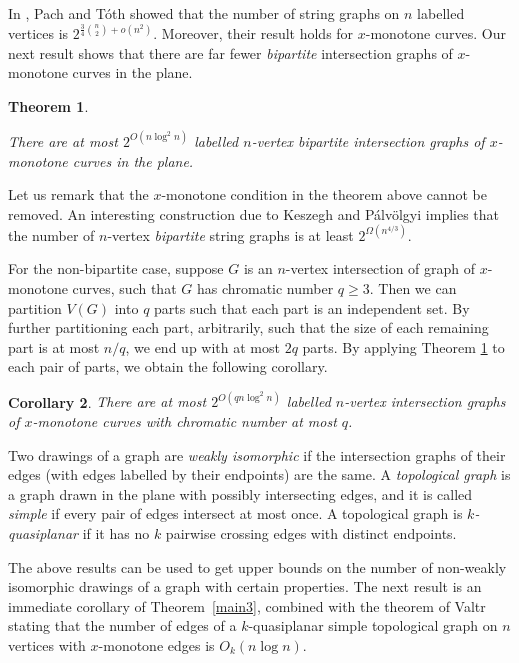 \documentclass[11pt]{article}
\theoremstyle{plain}
\newtheorem{theorem}{Theorem}[section]
\newtheorem{corollary}[theorem]{Corollary}
\theoremstyle{definition}
\theoremstyle{remark}
\begin{document}
In \cite{PT06}, Pach and T\'oth showed that the number of string graphs on $n$ labelled vertices is $2^{\frac{3}{4}\binom{n}{2}+o(n^2)}$.  Moreover, their result holds for $x$-monotone curves.  Our next result shows that there are far fewer \emph{bipartite} intersection graphs of $x$-monotone curves in the plane.






    
\begin{theorem}\label{main}

There are at most $2^{O(n\log^2 n)}$ labelled $n$-vertex bipartite intersection graphs of $x$-monotone curves in the plane.


\end{theorem}



\noindent Let us remark that the $x$-monotone condition in the theorem above cannot be removed.  An interesting construction due to Keszegh and P\'alv\"olgyi \cite{KP} implies that the number of $n$-vertex \emph{bipartite} string graphs is at least $2^{\Omega(n^{4/3})}$.   


For the non-bipartite case, suppose $G$ is an $n$-vertex intersection of graph of $x$-monotone curves, such that $G$ has chromatic number $q\geq 3$.  Then we can partition $V(G)$ into $q$ parts such that each part is an independent set. By further partitioning each part, arbitrarily, such that the size of each remaining part is at most $n/q$, we end up with at most $2q$ parts.  By applying Theorem \ref{main} to each pair of parts, we obtain the following corollary.


\begin{corollary}\label{main2}
There are at most $2^{O(qn\log^2 n)}$ labelled $n$-vertex intersection graphs of $x$-monotone curves with chromatic number at most $q$.

\end{corollary}

Two drawings of a graph are \emph{weakly isomorphic} if the intersection graphs of their edges (with edges labelled by their endpoints) are the same. 
A {\it topological graph} is a graph drawn in the plane with possibly intersecting edges, and it is called \emph{simple} if every pair of edges 
intersect at most once. A topological graph is \emph{$k$-quasiplanar} if it has no $k$ pairwise crossing edges with distinct endpoints. 

The above results can be used to get upper bounds on the number of non-weakly isomorphic drawings of a graph with certain properties. The next result is an immediate corollary of Theorem~\ref{main3}, combined with the theorem of Valtr~\cite{Valtr} stating that the number of edges of a $k$-quasiplanar simple topological graph on $n$ vertices with $x$-monotone edges is $O_k(n\log n)$. 
\end{document}
